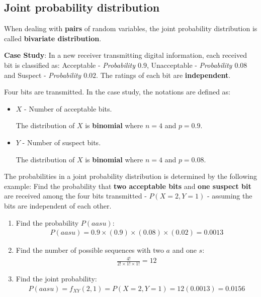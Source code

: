 \documentclass[10pt,a4paper]{article}
\begin{document}
\subsection{Joint probability distribution}

When dealing with \textbf{pairs} of random variables, the joint probability distribution is called
\textbf{bivariate distribution}. 

\textbf{Case Study}: In a new receiver transmitting digital information, each received bit is
classified as: Acceptable - \textit{Probability $0.9$}, Unacceptable - \textit{Probability $0.08$}
and Suspect - \textit{Probability $0.02$}. The ratings of each bit are \textbf{independent}. 

Four bits are transmitted. In the case study, the notations are defined as:
\begin{itemize}
    \item $X$ - Number of acceptable bits.
     
    The distribution of $X$ is \textbf{binomial} where $n = 4$ and $p = 0.9$.
    \item $Y$ - Number of suspect bits.
     
    The distribution of $X$ is \textbf{binomial} where $n = 4$ and $p = 0.08$.
\end{itemize}

The probabilities in a joint probability distribution is determined by the following example: Find
the probability that \textbf{two acceptable bits} and \textbf{one suspect bit} are received among
the four bits transmitted - $P(X=2, Y=1)$ - assuming the bits are independent of each other.
\begin{enumerate}
    \item Find the probability $P(aasu)$:
    \begin{align*}
        P(aasu) = 0.9 \times (0.9) \times (0.08) \times (0.02) = 0.0013
    \end{align*}
    \item Find the number of possible sequences with two $a$ and one $s$:
    \begin{align*}
        \frac{4!}{2!\times 1! \times 1!} = 12
    \end{align*}
    \item Find the joint probability:
    \begin{align*}
        P(aasu) = f_{XY}(2,1) = P(X=2,Y=1) = 12(0.0013) = 0.0156
    \end{align*}
\end{enumerate}
\end{document}
